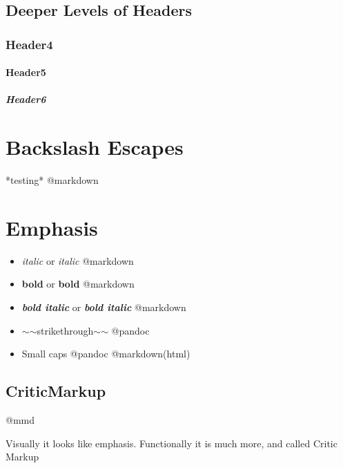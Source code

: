 \subsection{Deeper Levels of Headers}
\label{deeperlevelsofheaders}

\subsubsection{Header4}
\label{header4}

\paragraph{Header5}
\label{header5}

\subparagraph{Header6}
\label{header6}

\section{Backslash Escapes}
\label{backslashescapes}

*testing* @markdown

\section{Emphasis}
\label{emphasis}

\begin{itemize}
\item \emph{italic} or \emph{italic} @markdown

\item \textbf{bold} or \textbf{bold} @markdown

\item \textbf{\emph{bold italic}} or \textbf{\emph{bold italic}} @markdown

\item \ensuremath{\sim}\ensuremath{\sim}strikethrough\ensuremath{\sim}\ensuremath{\sim} @pandoc

\item Small caps @pandoc @markdown(html)

\end{itemize}

\subsection{CriticMarkup}
\label{criticmarkup}

@mmd

Visually it looks like emphasis. Functionally it is much more, and called Critic Markup

